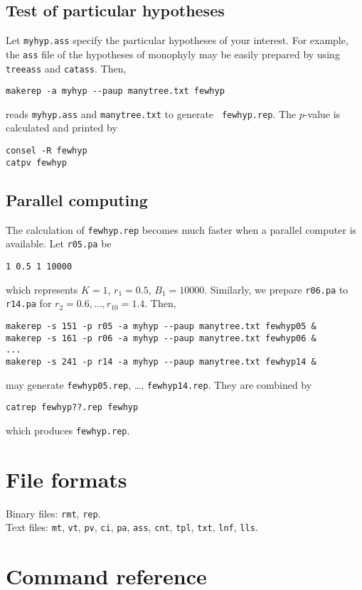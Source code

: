 \documentclass[12pt]{article}
\begin{document}
\subsection{Test of particular hypotheses}

Let {\tt myhyp.ass} specify the particular hypotheses of your
interest. For example, the {\tt ass} file of the hypotheses of monophyly
may be easily prepared by using {\tt treeass} and {\tt catass}. Then,
\begin{verbatim}
makerep -a myhyp --paup manytree.txt fewhyp
\end{verbatim}
reads {\tt myhyp.ass} and {\tt manytree.txt} to generate {\tt
fewhyp.rep}. The $p$-value is calculated and printed by
\begin{verbatim}
consel -R fewhyp
catpv fewhyp	
\end{verbatim}

\subsection{Parallel computing}

The calculation of {\tt fewhyp.rep} becomes much faster when a parallel
computer is available. Let {\tt r05.pa} be
\begin{verbatim}
1 0.5 1 10000
\end{verbatim}
which represents $K=1$, $r_1=0.5$, $B_1=10000$. Similarly, we prepare
{\tt r06.pa} to {\tt r14.pa} for $r_2=0.6,\ldots, r_{10}=1.4$. Then,
\begin{verbatim}
makerep -s 151 -p r05 -a myhyp --paup manytree.txt fewhyp05 &
makerep -s 161 -p r06 -a myhyp --paup manytree.txt fewhyp06 &
...
makerep -s 241 -p r14 -a myhyp --paup manytree.txt fewhyp14 &
\end{verbatim}
may generate {\tt fewhyp05.rep}, \ldots, {\tt fewhyp14.rep}. They are
combined by
\begin{verbatim}
catrep fewhyp??.rep fewhyp
\end{verbatim}
which produces {\tt fewhyp.rep}.


\section{File formats}

Binary files: {\tt rmt}, {\tt rep}.\\
Text files: {\tt mt}, {\tt vt}, {\tt pv}, {\tt ci}, {\tt pa}, {\tt ass},
{\tt cnt}, {\tt tpl}, {\tt txt}, {\tt lnf}, {\tt lls}.

\section{Command reference}
\end{document}
